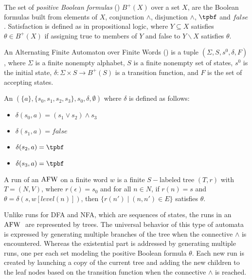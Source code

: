The set of \emph{positive Boolean formulas} (\pbf) $B^+(X)$ over a set $X$, are the Boolean formulas built from elements of $X$, conjunction $\wedge$, disjunction $\wedge$, $\tpbf$ and $\bm{\mathit{false}}$. Satisfaction is defined as in propositional logic, where $Y\subseteq X$ satisfies $\theta\in B^+(X)$ if assigning true to members of $Y$ and false to $Y\backslash X$ satisfies $\theta$.

\begin{definition}
    An Alternating Finite Automaton over Finite Words (\AFW) is a tuple $(\Sigma,S,s^0,\delta,F)$, where $\Sigma$ is a finite nonempty alphabet, $S$ is a finite nonempty set of states, $s^0$ is the initial state, $\delta : \Sigma \times S \to B^+(S)$ is a transition function, and $F$ is the set of accepting states.
\end{definition}


\begin{example}[\AFW]
    An \AFW $(\{a\},\{s_0,s_1,s_2,s_3\},s_0,\delta,\emptyset)$ where $\delta$ is defined as follows: 
    \begin{multicols*}{2}
        \begin{itemize}
            \item $\delta(s_0,a)=(s_1 \vee s_2) \wedge s_3$
            \item $\delta(s_1,a)=\bm{\mathit{false}}$
            \item $\delta(s_2,a)=\tpbf$
            \item $\delta(s_3,a)=\tpbf$
        \end{itemize}
    \end{multicols*}
    
\end{example}


\begin{definition}[Run]
    A run of an $\mathrm{AFW}$ on a finite word $w$ is a finite $S-$labeled tree $(T,r)$ with $T=(N,V)$, where $r(\epsilon)=s_0$ and for all $n\in N$, if $r(n) = s$ and $\theta = \delta(s,w[\mathit{level}(n)])$, then $\{r(n') \mid (n,n') \in E\}$ satisfies $\theta$.
\end{definition}


Unlike runs for DFA and NFA, which are sequences of states, the runs in an $\mathrm{AFW} \;$ are represented by trees. The universal behavior of this type of automata is expressed by generating multiple branches of the tree when the connective $\wedge$ is encountered. Whereas the existential part is addressed by generating multiple runs, one per each set modeling the positive Boolean formula $\theta$. Each new run is created by launching a copy of the current tree and adding the new children to the leaf nodes based on the transition function when the connective $\wedge$ is reached. 

